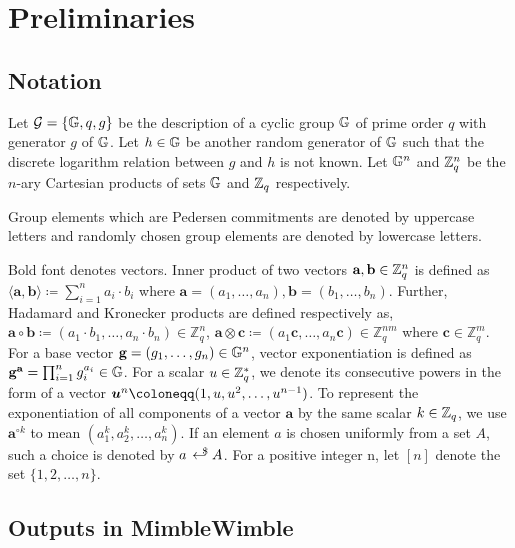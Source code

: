 

%
%
%
\vspace{-2pt}
\section{Preliminaries}
\vspace{-4pt}
\subsection{Notation}
Let $\mathcal{G} = \{ \mathbb{G}, q, g \}$ be the description of a cyclic group $\mathbb{G}$ of prime order $q$ with generator $g$ of $\mathbb{G}$. Let $h\in \mathbb{G}$ be another random generator of $\mathbb{G}$ such that the discrete logarithm relation between $g$ and $h$ is not known. Let
$\mathbb{G}^n$ and $\mathbb{Z}^n_q$ be the $n$-ary Cartesian products of sets $\mathbb{G}$ and $\mathbb{Z}_q$ respectively.

Group elements which are Pedersen commitments are denoted by uppercase letters and randomly chosen group elements are denoted by lowercase letters.

Bold font denotes vectors.
Inner product of two vectors $\textbf{a}, \textbf{b} \in \mathbb{Z}_q^n$ is defined as $\langle \textbf{a},\textbf{b} \rangle \coloneqq \sum_{i=1}^{n} a_i \cdot b_i$ where $\textbf{a}=(a_1,\dots, a_n), \textbf{b}=(b_1,\dots,b_n)$. Further, Hadamard and Kronecker products are defined respectively as, $\textbf{a} \circ \textbf{b} \coloneqq (a_1 \cdot b_1, \dots, a_n \cdot b_n) \in \mathbb{Z}_q^n$, $\textbf{a} \otimes \textbf{c} \coloneqq (a_1 \textbf{c}, \dots, a_n \textbf{c}) \in \mathbb{Z}_q^{nm}$ where $\textbf{c} \in \mathbb{Z}_q^m$. For a base vector $\textbf{g} = (g_1, \dots, g_n) \in \mathbb{G}^n$, vector exponentiation is defined as $\textbf{g}^{\textbf{a}} = \prod_{i=1}^{n}g_i^{a_i} \in \mathbb{G}$. For a scalar $u \in \mathbb{Z}_q^{\ast}$, we denote its consecutive powers in the form of a vector $\vecnb{u}^{n} \coloneqq (1, u, u^2, \dots, u^{n-1})$.
To represent the exponentiation of all components of a vector $\textbf{a}$ by the same scalar $k \in \mathbb{Z}_q$, we use $\textbf{a}^{\circ k}$ to mean $(a_1^k, a_2^k, \ldots,a_n^{k})$.
If an element $a$ is chosen uniformly from a set $A$, such a choice is denoted by $a \rgen A$.
For a positive integer n, let $[n]$ denote the set $\{1,2,\dots,n\}$.

\subsection{Outputs in MimbleWimble}

